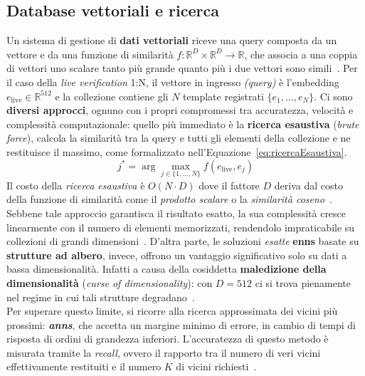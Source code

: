 \subsection{Database vettoriali e ricerca}
Un sistema di gestione di \textbf{dati vettoriali} riceve una query composta da un vettore e da una funzione di similarità $f : \mathbb{R}^D \times \mathbb{R}^D \to \mathbb{R}$, che associa a una coppia di vettori uno scalare tanto più grande quanto più i due vettori sono simili~\cite{panSurveyVectorDatabase2023}.
Per il caso della \textit{live verification} 1:N, il vettore in ingresso \textit{(query)} è l'embedding $e_{\text{live}} \in \mathbb{R}^{512}$ e la collezione contiene gli $N$ template registrati $\{e_1, \dots, e_N\}$. 
Ci sono \textbf{diversi approcci}, ognuno con i propri compromessi tra accuratezza, velocità e complessità computazionale:
quello più immediato è la \textbf{ricerca esaustiva} (\textit{brute force}), calcola la similarità tra la query e tutti gli elementi della collezione e ne restituisce il massimo, come formalizzato nell'Equazione~\eqref{eq:ricercaEsaustiva}.
\begin{equation}
    j^{*} = \arg\max_{j \in \{1,\dots,N\}} f(e_{\text{live}}, e_j)
    \label{eq:ricercaEsaustiva}
\end{equation}
Il costo della \textit{ricerca esaustiva} è $O(N \cdot D)$ dove il fattore $D$ deriva dal costo della funzione di similarità come il \textit{prodotto scalare} o la \textit{similarità coseno}~\cite{panSurveyVectorDatabase2023}. 
Sebbene tale approccio garantisca il risultato esatto, la sua complessità cresce linearmente con il numero di elementi memorizzati, rendendolo impraticabile su collezioni di grandi dimensioni~\cite{malkovEfficientRobustApproximate2018}. 
D'altra parte, le soluzioni \textit{esatte} \textbf{\gls{enns}} basate su \textbf{strutture ad albero}, invece, offrono un vantaggio significativo solo su dati a bassa dimensionalità. Infatti a causa della cosiddetta \textbf{maledizione della dimensionalità} (\textit{curse of dimensionality}): con $D = 512$ ci si trova pienamente nel regime in cui tali strutture degradano~\cite{malkovEfficientRobustApproximate2018}.\\
Per superare questo limite, si ricorre alla ricerca approssimata dei vicini più prossimi: \textbf{\textit{\gls{anns}}}, che accetta un margine minimo di errore, in cambio di tempi di risposta di ordini di grandezza inferiori. 
L'accuratezza di questo metodo è misurata tramite la \textit{recall}, ovvero il rapporto tra il numero di veri vicini effettivamente restituiti e il numero $K$ di vicini richiesti~\cite{malkovEfficientRobustApproximate2018}. 
